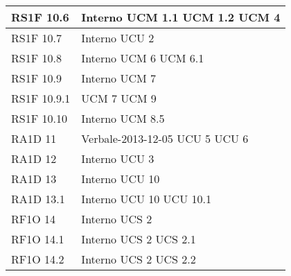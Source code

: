 \begin{center}
\begin{longtable}{ | p{5cm} | p{5cm} |}
				RS1F 10.6 &  Interno \newline  UCM 1.1 \newline  UCM 1.2 \newline  UCM 4 \newline  \\ \hline      
				RS1F 10.7 &  Interno \newline  UCU 2 \newline  \\ \hline      
				RS1F 10.8 &  Interno \newline  UCM 6 \newline  UCM 6.1 \newline  \\ \hline      
				RS1F 10.9 &  Interno \newline  UCM 7 \newline  \\ \hline      
				RS1F 10.9.1 &  UCM 7 \newline  UCM 9 \newline  \\ \hline      
				RS1F 10.10 &  Interno \newline  UCM 8.5 \newline  \\ \hline      
				RA1D 11 &  Verbale-2013-12-05 \newline  UCU 5 \newline  UCU 6 \newline  \\ \hline      
				RA1D 12 &  Interno \newline  UCU 3 \newline  \\ \hline      
				RA1D 13 &  Interno \newline  UCU 10 \newline  \\ \hline      
				RA1D 13.1 &  Interno \newline  UCU 10 \newline  UCU 10.1 \newline  \\ \hline      
				RF1O 14 &  Interno \newline  UCS 2 \newline  \\ \hline      
				RF1O 14.1 &  Interno \newline  UCS 2 \newline  UCS 2.1 \newline  \\ \hline      
				RF1O 14.2 &  Interno \newline  UCS 2 \newline  UCS 2.2 \newline  \\ \hline      

\end{longtable}
\end{center}
